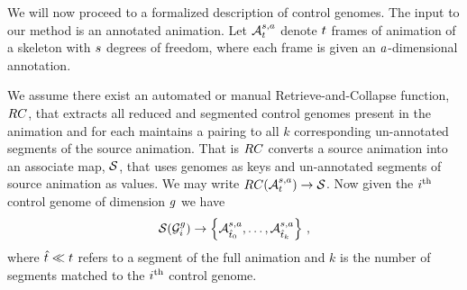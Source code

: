 We will now proceed to a formalized description of control genomes. The input to our method is an annotated animation. Let $\mathcal{A}^{s,a}_t$ denote $t$ frames of animation of a skeleton with $s$ degrees of freedom, where each frame is given an $a$-dimensional annotation. 

We assume there exist an automated or manual Retrieve-and-Collapse function, ${RC}$,  that extracts all reduced and segmented control genomes present in the animation and for each maintains a pairing to all $k$ corresponding un-annotated segments of the source animation. That is ${RC}$ converts a source animation into an associate map, $\mathcal{S}$, that uses genomes as keys and un-annotated segments of source animation as values. We may write ${RC}(\mathcal{A}^{s,a}_t) \rightarrow \mathcal{S}$. Now given the $i ^{\text{th}}$ control genome of dimension $g$ we have
\begin{equation}
 \mathcal{S}(\mathcal{G}^g_i) \rightarrow \left\{\mathcal{A}^{s,a}_{{\hat{t}}_0},\ldots,\mathcal{A}^{s,a}_{{\hat{t}}_k}\right\}   \,,
\end{equation}
where ${\hat{t}}\ll t$ refers to a segment of the full animation and $k$ is the number of segments matched to the $i ^{\text{th}}$ control genome.

